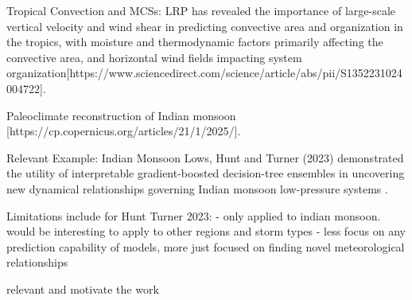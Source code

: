 Tropical Convection and MCSs: LRP has revealed the importance of large-scale vertical velocity and wind shear in predicting convective area and organization in the tropics, with moisture and thermodynamic factors primarily affecting the convective area, and horizontal wind fields impacting system organization[https://www.sciencedirect.com/science/article/abs/pii/S1352231024004722].

Paleoclimate reconstruction of Indian monsoon [https://cp.copernicus.org/articles/21/1/2025/].

Relevant Example: Indian Monsoon Lows, Hunt and Turner (2023) demonstrated the utility of interpretable gradient-boosted decision-tree ensembles in uncovering new dynamical relationships governing Indian monsoon low-pressure systems \citep{Hunt2024}. 

Limitations include for Hunt Turner 2023: 
- only applied to indian monsoon. would be interesting to apply to other regions and storm types
- less focus on any prediction capability of models, more just focused on finding novel meteorological relationships

relevant and motivate the work